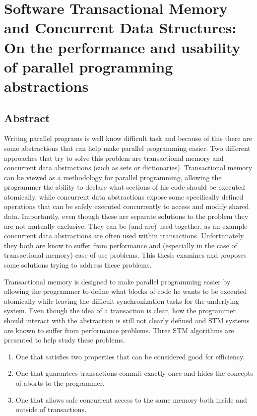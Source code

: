 \documentclass[11pt]{book}
\begin{document}








\section*{Software Transactional Memory and Concurrent Data Structures: On the performance and usability of parallel programming abstractions}
\subsection*{Abstract}
Writing parallel programs is well know difficult task and because of this
there are some abstractions that can help make parallel programming easier.
Two different approaches that try to solve this problem are transactional memory and
concurrent data abstractions (such as sets or dictionaries).
Transactional memory can be viewed as a methodology for parallel programming, allowing
the programmer the ability to declare what sections of his code should be executed atomically,
while concurrent data abstractions expose some specifically defined operations that can be
safely executed concurrently to access and modify shared data.
Importantly, even though these are separate solutions to the problem they are not mutually exclusive.
They can be (and are) used together, as an example concurrent data abstractions are often used within transactions.
Unfortunately they both are know to suffer from performance and (especially in the case of transactional memory)
ease of use problems.
This thesis examines and proposes some solutions trying to address these problems.

Transactional memory is designed to make parallel programming easier by allowing the programmer to define
what blocks of code he wants to be executed atomically while leaving the difficult synchronization tasks for the
underlying system.
Even though the idea of a transaction is clear, how the programmer should interact with the
abstraction is still not clearly defined and STM systems are known to suffer from performance problems.
Three STM algorithms are presented to help study these problems.
\begin{enumerate}
\item One that satisfies two properties that can be considered good for efficiency.
\item One that guarantees transactions commit exactly once and hides the concepts of aborts to the programmer.
\item One that allows safe concurrent access to the same memory both inside and outside of transactions.
\end{enumerate}
\end{document}
